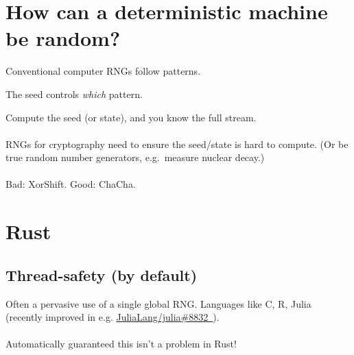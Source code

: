 \documentclass[14pt]{beamer}
\newcommand{\exthref}[2]{\href{#1}{#2\ \footnotesize\faExternalLink}}
\begin{document}
\section{How can a deterministic machine be random?}
\begin{frame}
  Conventional computer RNGs follow patterns.
  \begin{center}
  \end{center}

  The seed controls \textit{which} pattern.
\end{frame}

\begin{frame}
  Compute the seed (or state), and you know the full stream. \\~\\

  RNGs for cryptography need to ensure the seed/state is hard to
  compute. (Or be true random number generators, e.g.~measure nuclear
  decay.) \\~\\

  Bad: XorShift. Good: ChaCha.
\end{frame}

\section{Rust}

\subsection[Thread-safety]{Thread-safety (by default)}
\begin{frame}
  Often a pervasive use of a single global RNG\@.
  Languages like C, R, Julia (recently improved in e.g. \exthref{https://github.com/JuliaLang/julia/pull/8832}{JuliaLang/julia\#8832}).\\~\\

  Automatically guaranteed this isn't a problem in Rust!
\end{frame}
\end{document}
